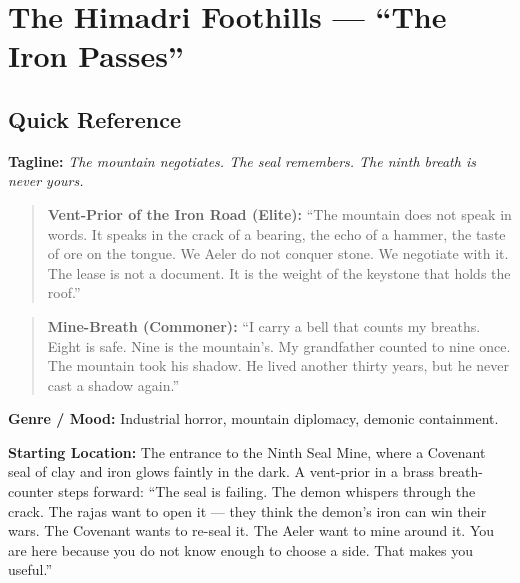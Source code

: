 \section{The Himadri Foothills --- ``The Iron Passes''}
\label{chap:himadri}

\subsection*{Quick Reference}
\textbf{Tagline:} \textit{The mountain negotiates. The seal remembers. The ninth breath is never yours.}

\begin{quote}
  \textbf{Vent-Prior of the Iron Road (Elite):}  
  ``The mountain does not speak in words. It speaks in the crack of a bearing, the echo of a hammer, the taste of ore on the tongue. We Aeler do not conquer stone. We negotiate with it. The lease is not a document. It is the weight of the keystone that holds the roof.''
\end{quote}

\begin{quote}
  \textbf{Mine-Breath (Commoner):}  
  ``I carry a bell that counts my breaths. Eight is safe. Nine is the mountain's. My grandfather counted to nine once. The mountain took his shadow. He lived another thirty years, but he never cast a shadow again.''
\end{quote}

\textbf{Genre / Mood:} Industrial horror, mountain diplomacy, demonic containment.

\textbf{Starting Location:} The entrance to the Ninth Seal Mine, where a Covenant seal of clay and iron glows faintly in the dark. A vent-prior in a brass breath-counter steps forward: ``The seal is failing. The demon whispers through the crack. The rajas want to open it — they think the demon's iron can win their wars. The Covenant wants to re-seal it. The Aeler want to mine around it. You are here because you do not know enough to choose a side. That makes you useful.''


